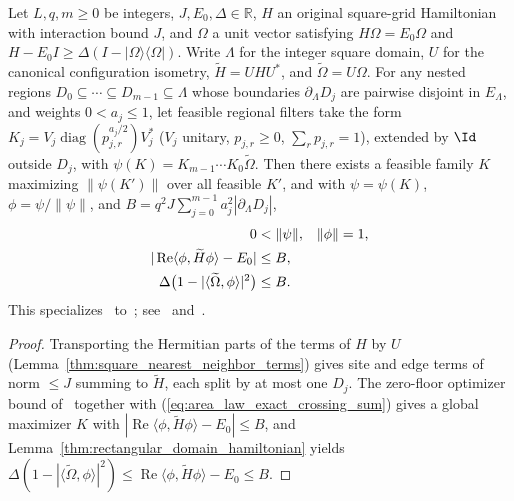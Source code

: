\begin{lemma}
    \label{thm:square_zero_floor_maximizer_energy}
    \leanok
    Let $L,q,m\ge0$ be integers, $J,E_0,\Delta\in\mathbb R$, $H$ an original square-grid Hamiltonian with interaction bound $J$, and $\Omega$ a unit vector satisfying $H\Omega=E_0\Omega$ and $H-E_0I\ge\Delta(I-|\Omega\rangle\langle\Omega|)$. Write $\Lambda$ for the integer square domain, $U$ for the canonical configuration isometry, $\widetilde H=UHU^*$, and $\widetilde\Omega=U\Omega$.
    For any nested regions $D_0\subseteq\cdots\subseteq D_{m-1}\subseteq\Lambda$ whose boundaries $\partial_\Lambda D_j$ are pairwise disjoint in $E_\Lambda$, and weights $0<a_j\le1$, let feasible regional filters take the form $K_j=V_j\operatorname{diag}(p_{j,r}^{a_j/2})V_j^*$ ($V_j$ unitary, $p_{j,r}\ge0$, $\sum_r p_{j,r}=1$), extended by $\Id$ outside $D_j$, with $\psi(K)=K_{m-1}\cdots K_0\widetilde\Omega$. Then there exists a feasible family $K$ maximizing $\|\psi(K')\|$ over all feasible $K'$, and with $\psi=\psi(K)$, $\phi=\psi/\|\psi\|$, and $B=q^2J\sum_{j=0}^{m-1}a_j^2|\partial_\Lambda D_j|$,
    \begin{align}
        0 & < \|\psi\|,                                & \|\phi\| & =1, \notag \\
        |\operatorname{Re}\langle\phi,\widetilde H\phi\rangle-E_0|
          & \le B, \notag                                                      \\
        \Delta\bigl(1-|\langle\widetilde\Omega,\phi\rangle|^2\bigr)
          & \le B. \label{eq:square_zero_floor_energy}
    \end{align}
    This specializes~\cite{QICLean2026ZeroFloorEnergy} to~\cite{OpenAI2026PolynomialPEPS}; see~\cite{gap:oai26_zero_floor_energy_scope} and~\cite{gap:polypeps_square_zero_floor_optimizer_scope}.
\end{lemma}
\begin{proof}\leanok
    Transporting the Hermitian parts of the terms of $H$ by $U$ (Lemma~\ref{thm:square_nearest_neighbor_terms}) gives site and edge terms of norm $\le J$ summing to $\widetilde H$, each split by at most one $D_j$. The zero-floor optimizer bound of~\cite{QICLean2026ZeroFloorEnergy} together with (\ref{eq:area_law_exact_crossing_sum}) gives a global maximizer $K$ with $|\operatorname{Re}\langle\phi,\widetilde H\phi\rangle-E_0|\le B$, and Lemma~\ref{thm:rectangular_domain_hamiltonian} yields $\Delta(1-|\langle\widetilde\Omega,\phi\rangle|^2)\le\operatorname{Re}\langle\phi,\widetilde H\phi\rangle-E_0\le B$.
\end{proof}

